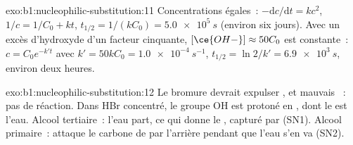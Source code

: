 \begin{solution}{exo:b1:nucleophilic-substitution:11}
Concentrations égales~: $-\mathrm{d}c/\mathrm{d}t = kc^2$, $1/c = 1/C_0 + kt$,
$t_{1/2} = 1/(kC_0) = \qty{5.0e5}{s}$ (environ six jours). Avec un excès
d'hydroxyde d'un facteur cinquante, $[\ce{OH-}] \approx 50C_0$ est
constante~: $c = C_0
e^{-k't}$ avec $k' = 50kC_0 = \qty{1.0e-4}{s^{-1}}$, $t_{1/2} = \ln 2/k' =
\qty{6.9e3}{s}$, environ deux heures.
\end{solution}

\begin{solution}{exo:b1:nucleophilic-substitution:12}
Le bromure devrait expulser ,  et mauvais ~: pas de réaction. Dans HBr concentré, le groupe OH est protoné
en , dont le  est l'eau. Alcool tertiaire~: l'eau
part, ce qui donne le , capturé par  (SN1). Alcool
primaire~:  attaque le carbone de  par l'arrière
pendant que l'eau s'en va (SN2).
\end{solution}

